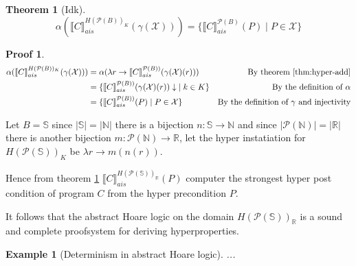 \documentclass{article}
\newtheorem{theorem}{Theorem}
\newtheorem{proofs}{Proof}
\newtheorem{exmp}{Example}[section]
\def\rr{\rightarrow}
\newcommand*{\sem}[1]{
    \llbracket #1 \rrbracket
}
\newcommand{\bca}[2]{
    #2_{ais}^{#1}
}
\newcommand{\bsem}[2][A]{
    \bca{#1}{\sem{#2}}
}
\newcommand{\pow}[1]{
    \mathcal{P}(#1)
}
\def\rr{\rightarrow}
\def\state{\mathbb{S}}
\begin{document}
    \begin{theorem}[Idk]\label{thm:hyperpost} 
        $$\alpha(\bsem[H(\pow{B})_K]{C}(\gamma(\mathcal{X}))) = 
        \{ \bsem[\pow{B}]{C}(P) \mid P \in \mathcal{X} \}$$
    \end{theorem}
    \begin{proofs}
        \begin{align*}
            \alpha(\bsem[H(\pow{B})_K]{C}(\gamma(\mathcal{X})))
                &= \alpha(\lambda r \rr 
                    \bsem[\pow{B})]{C}(\gamma(\mathcal{X})(r)))
                &\text{By theorem \ref{thm:hyper-add}} \\
                &= \{ \bsem[\pow{B})]{C}(\gamma(\mathcal{X})(r))\downarrow \;
                    \mid k \in K \}
                &\text{By the definition of $\alpha$}\\
                &= \{ \bsem[\pow{B})]{C}(P) \mid P \in \mathcal{X} \}
                &\text{By the definition of $\gamma$ and injectivity}\\
        \end{align*}
    \end{proofs}

    Let $B = \state$ since $|\state| = |\mathbb{N}|$ there is a bijection $n:
    \state \rr \mathbb{N}$ and since $|\pow{\mathbb{N}}| = |\mathbb{R}|$ there is
    another bijection $m : \pow{\mathbb{N}} \rr \mathbb{R}$,
    let the hyper instatiation for $H(\pow{\state})_K$ be $\lambda r \rr 
    m(n(r))$.

    Hence from theorem \ref{thm:hyperpost} 
    $\bsem[H(\pow{\state})_\mathbb{R}]{C}(P)$ computer the strongest hyper 
    post condition of program $C$ from the hyper precondition $P$.

    It follows that the abstract Hoare logic on the domain 
    $H(\pow{\state})_\mathbb{R}$ is a sound and complete proofsystem for
    deriving hyperproperties.

    \begin{exmp}[Determinism in abstract Hoare logic]
        ...
    \end{exmp}
\end{document}
